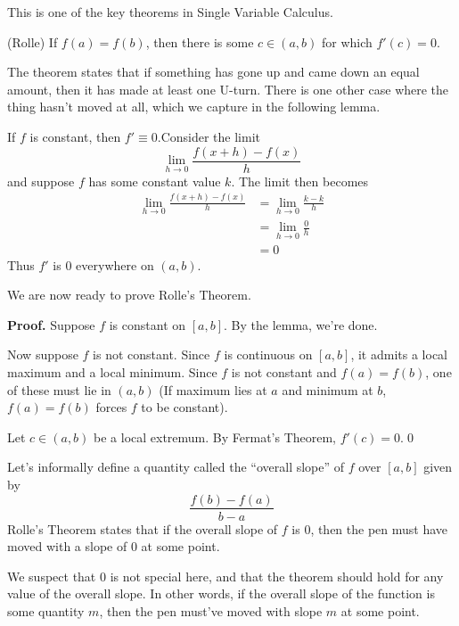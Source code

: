 This is one of the key theorems in Single Variable Calculus.
\begin{SNP}{\thm}{(Rolle) If $f(a) = f(b)$, then there is some $c \in (a, b)$ for which $f'(c) = 0$.}
\end{SNP}
The theorem states that if something has gone up and came down an equal amount, then it has made at least one U-turn. There is one other case where the thing hasn't moved at all, which we capture in the following lemma.
\begin{SWP}{\lm}{If $f$ is constant, then $f' \equiv 0$.}Consider the limit $$\lim_{h\rightarrow 0}\frac{f(x + h) - f(x)}{h}$$
and suppose $f$ has some constant value $k$. The limit then becomes
\begin{align*}
\lim_{h \rightarrow 0}\frac{f(x + h) - f(x)}{h} &= \lim_{h \rightarrow 0}\frac{k - k}{h}\\ &= \lim_{h \rightarrow 0}\frac{0}{h}\\ &= 0
\end{align*}
Thus $f'$ is $0$ everywhere on $(a, b)$.
\end{SWP}
We are now ready to prove Rolle's Theorem.
\begin{smrg}\textbf{Proof.} Suppose $f$ is constant on $[a, b]$. By the lemma, we're done.

Now suppose $f$ is not constant. Since $f$ is continuous on $[a, b]$, it admits a local maximum and a local minimum. Since $f$ is not constant and $f(a) = f(b)$, one of these must lie in $(a, b)$ (If maximum lies at $a$ and minimum at $b$, $f(a) = f(b)$ forces $f$ to be constant).

Let $c \in (a, b)$ be a local extremum. By Fermat's Theorem, $f'(c) = 0$.\qed
\end{smrg}
Let's informally define a quantity called the ``overall slope'' of $f$ over $[a, b]$ given by$$
\frac{f(b) - f(a)}{b - a}
$$
Rolle's Theorem states that if the overall slope of $f$ is $0$, then the pen must have moved with a slope of $0$ at some point.

We suspect that $0$ is not special here, and that the theorem should hold for any value of the overall slope. In other words, if the overall slope of the function is some quantity $m$, then the pen must've moved with slope $m$ at some point.

